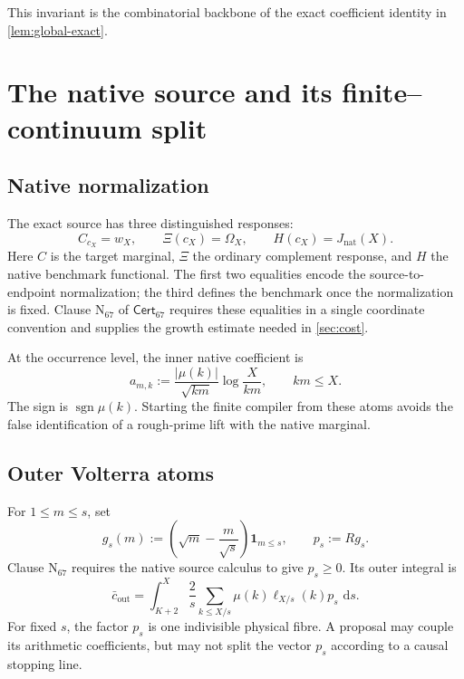 \documentclass[11pt]{article}
\theoremstyle{definition}
\theoremstyle{remark}
\newcommand{\1}{\mathbf 1}
\newcommand{\Cert}{\mathsf{Cert}_{67}}
\newcommand{\Nat}{\mathrm{nat}}
\newcommand{\dd}{\,\mathrm d}
\begin{document}
This invariant is the combinatorial backbone of the exact coefficient identity in \cref{lem:global-exact}.

\section{The native source and its finite--continuum split}\label{sec:native}

\subsection{Native normalization}

The exact source has three distinguished responses:
\begin{equation}\label{eq:native-normalization}
C_{c_X}=w_X,
\qquad
\Xi(c_X)=\Omega_X,
\qquad
H(c_X)=J_{\Nat}(X).
\end{equation}
Here \(C\) is the target marginal, \(\Xi\) the ordinary complement response, and \(H\) the native benchmark functional.  The first two equalities encode the source-to-endpoint normalization; the third defines the benchmark once the normalization is fixed.  Clause \(\mathrm N_{67}\) of \(\Cert\) requires these equalities in a single coordinate convention and supplies the growth estimate needed in \cref{sec:cost}.

At the occurrence level, the inner native coefficient is
\begin{equation}\label{eq:inner-coeff}
a_{m,k}:=\frac{|\mu(k)|}{\sqrt{km}}\log\frac{X}{km},
\qquad km\le X.
\end{equation}
The sign is \(\operatorname{sgn}\mu(k)\).  Starting the finite compiler from these atoms avoids the false identification of a rough-prime lift with the native marginal.

\subsection{Outer Volterra atoms}

For \(1\le m\le s\), set
\begin{equation}\label{eq:gs}
g_s(m):=\left(\sqrt m-\frac m{\sqrt s}\right)\1_{m\le s},
\qquad p_s:=Rg_s.
\end{equation}
Clause \(\mathrm N_{67}\) requires the native source calculus to give \(p_s\ge0\).  Its outer integral is
\begin{equation}\label{eq:outer-source}
\bar c_{\mathrm{out}}
=
\int_{K+2}^{X}\frac2s
\sum_{k\le X/s}\mu(k)\ell_{X/s}(k)p_s\,\dd s.
\end{equation}
For fixed \(s\), the factor \(p_s\) is one indivisible physical fibre.  A proposal may couple its arithmetic coefficients, but may not split the vector \(p_s\) according to a causal stopping line.
\end{document}
